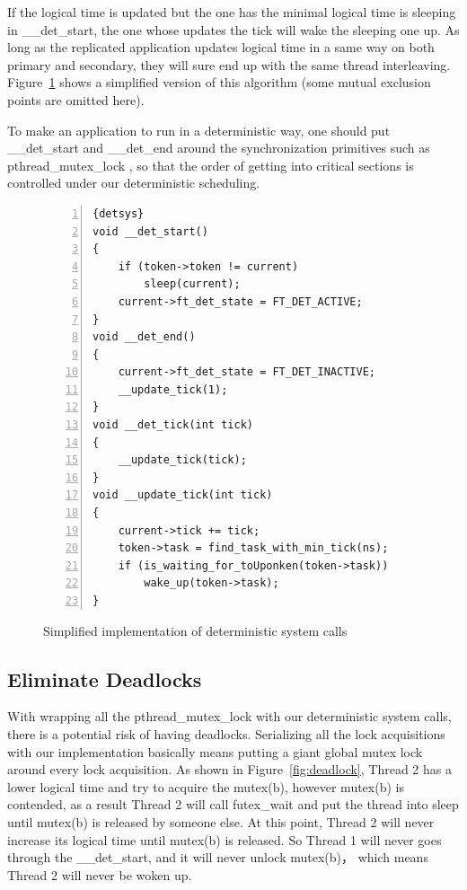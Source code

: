 If the logical time is updated but the one has the minimal logical time is sleeping in \_\_det\_start, the one whose updates the tick will wake the sleeping one up. As long as the replicated application updates logical time in a same way on both primary and secondary, they will sure end up with the same thread interleaving. Figure~\ref{f:algorithm} shows a simplified version of this algorithm (some mutual exclusion points are omitted here).

To make an application to run in a deterministic way, one should put \_\_det\_start and \_\_det\_end around the synchronization primitives such as pthread\_mutex\_lock , so that the order of getting into critical sections is controlled under our deterministic scheduling.

\begin{figure}
\begin{lstlisting}[numbers=left, frame=single, basicstyle=\small, breaklines]{detsys}
void __det_start()
{
    if (token->token != current)
        sleep(current);
    current->ft_det_state = FT_DET_ACTIVE;        
}
void __det_end()
{
    current->ft_det_state = FT_DET_INACTIVE;
    __update_tick(1);
}
void __det_tick(int tick)
{
    __update_tick(tick);
}
void __update_tick(int tick)
{
    current->tick += tick;
    token->task = find_task_with_min_tick(ns);
    if (is_waiting_for_toUponken(token->task))
    	wake_up(token->task);
}
\end{lstlisting}
\caption{Simplified implementation of deterministic system calls}
\label{f:algorithm}
\end{figure}


\subsection{Eliminate Deadlocks} \label{sec:edeadlock}
With wrapping all the pthread\_mutex\_lock with our deterministic system calls, there is a potential risk of having deadlocks. Serializing all the lock acquisitions with our implementation basically means putting a giant global mutex lock around every lock acquisition. As shown in Figure~\ref{fig:deadlock}, Thread 2 has a lower logical time and try to acquire the mutex(b), however mutex(b) is contended, as a result Thread 2 will call futex\_wait and put the thread into sleep until mutex(b) is released by someone else. At this point, Thread 2 will never increase its logical time until mutex(b) is released. So Thread 1 will never goes through the \_\_det\_start, and it will never unlock mutex(b)， which means Thread 2 will never be woken up.


